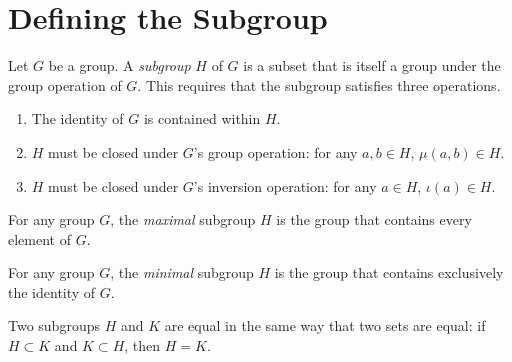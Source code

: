 \section{Defining the Subgroup}

\begin{definition}
    \label{definition : Subgroup}
    \leanok
    Let $G$ be a group. A \textit{subgroup} $H$ of $G$ is a subset that is itself a group under the group operation of $G$. This requires that the subgroup satisfies three operations.

    \begin{enumerate}
        \item The identity of $G$ is contained within $H$.
        \item $H$ must be closed under $G$'s group operation: for any $a,b \in H$, $\mu(a,b) \in H$.
        \item $H$ must be closed under $G$'s inversion operation: for any $a \in H$, $\iota(a) \in H$.
    \end{enumerate}
\end{definition}

\begin{definition}
    \label{definition : Maximal}
    \leanok
    For any group $G$, the \textit{maximal} subgroup $H$ is the group that contains every element of $G$.
\end{definition}

\begin{definition}
    \label{definition : Minimal}
    \leanok
    For any group $G$, the \textit{minimal} subgroup $H$ is the group that contains exclusively the identity of $G$.
\end{definition}

\begin{theorem}
    \label{theorem : Subgroup_ext}
    \leanok
    Two subgroups $H$ and $K$ are equal in the same way that two sets are equal: if $H \subset K$ and $K \subset H$, then $H = K$.
\end{theorem}

